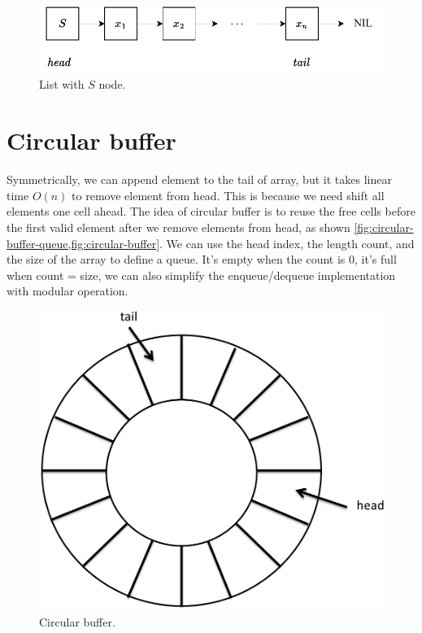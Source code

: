 \documentclass[b5paper]{article}
\begin{document}
\begin{figure}[htbp]
  \centering
  \includegraphics[scale=0.8]{img/slistq}
  \caption{List with $S$ node.}
  \label{fig:list-queue}
\end{figure}

\section{Circular buffer}

Symmetrically, we can append element to the tail of array, but it takes linear time $O(n)$ to remove element from head. This is because we need shift all elements one cell ahead. The idea of circular buffer is to reuse the free cells before the first valid element after we remove elements from head, as shown \cref{fig:circular-buffer-queue,fig:circular-buffer}. We can use the head index, the length count, and the size of the array to define a queue. It's empty when the count is 0, it's full when count = size, we can also simplify the enqueue/dequeue implementation with modular operation.

\begin{figure}[htbp]
 \centering
 \includegraphics[scale=0.3]{img/ring-buffer}
 \caption{Circular buffer.}
 \label{fig:circular-buffer}
\end{figure}
\end{document}
